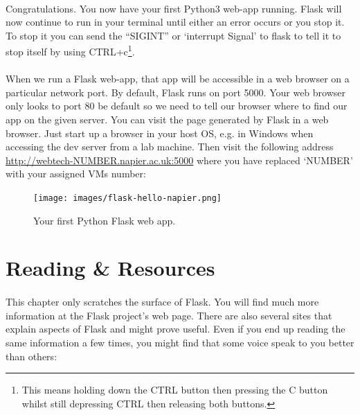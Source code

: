 \documentclass[12pt, a4paper, oneside]{book}
\begin{document}
\paragraph{} Congratulations. You now have your first Python3 web-app running. Flask will now continue to run in your terminal until either an error occurs or you stop it. To stop it you can send the ``SIGINT'' or `interrupt Signal' to flask to tell it to stop itself by using CTRL+c\footnote{This means holding down the CTRL button then pressing the C button whilst still depressing CTRL then releasing both buttons.}.

\paragraph{} When we run a Flask web-app, that app will be accessible in a web browser on a particular network port. By default, Flask runs on port 5000. Your web browser only looks to port 80 be default so we need to tell our browser where to find our app on the given server. You can visit the page generated by Flask in a web browser. Just start up a browser in your host OS, e.g. in Windows when accessing the dev server from a lab machine. Then visit the following address \url{http://webtech-NUMBER.napier.ac.uk:5000} where you have replaced `NUMBER' with your assigned VMs number:

\begin{figure}[H]
\centering
\texttt{[image: images/flask-hello-napier.png]}
\caption{Your first Python Flask web app.}
\label{fig:flask-hello-napier}
\end{figure}


\section{Reading \& Resources}
\paragraph{} This chapter only scratches the surface of Flask. You will find much more information at the Flask project's web page. There are also several sites that explain aspects of Flask and might prove useful. Even if you end up reading the same information a few times, you might find that some voice speak to you better than others:
\end{document}

